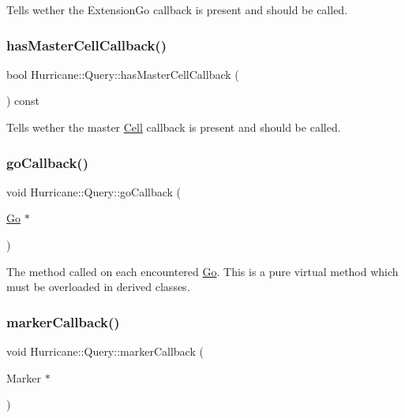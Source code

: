 Tells wether the Extension\+Go callback is present and should be called. \mbox{\label{classHurricane_1_1Query_a7ebb7b16bab183cd4508dc5639bd12ab}} 
\subsubsection{\texorpdfstring{has\+Master\+Cell\+Callback()}{hasMasterCellCallback()}}
{\footnotesize\ttfamily bool Hurricane\+::\+Query\+::has\+Master\+Cell\+Callback (\begin{DoxyParamCaption}{ }\end{DoxyParamCaption}) const\hspace{0.3cm}{\ttfamily [virtual]}}

Tells wether the master \hyperlink{classHurricane_1_1Cell}{Cell} callback is present and should be called. \mbox{\label{classHurricane_1_1Query_a59007148bd0afa0405801f341e7e4139}} 
\subsubsection{\texorpdfstring{go\+Callback()}{goCallback()}}
{\footnotesize\ttfamily void Hurricane\+::\+Query\+::go\+Callback (\begin{DoxyParamCaption}\item[{\hyperlink{classHurricane_1_1Go}{Go} $\ast$}]{ }\end{DoxyParamCaption})\hspace{0.3cm}{\ttfamily [pure virtual]}}

The method called on each encountered \hyperlink{classHurricane_1_1Go}{Go}. This is a pure virtual method which must be overloaded in derived classes. \mbox{\label{classHurricane_1_1Query_a4ad5bf076073f107189d4b7ee48f040e}} 
\subsubsection{\texorpdfstring{marker\+Callback()}{markerCallback()}}
{\footnotesize\ttfamily void Hurricane\+::\+Query\+::marker\+Callback (\begin{DoxyParamCaption}\item[{Marker $\ast$}]{ }\end{DoxyParamCaption})\hspace{0.3cm}{\ttfamily [virtual]}}

